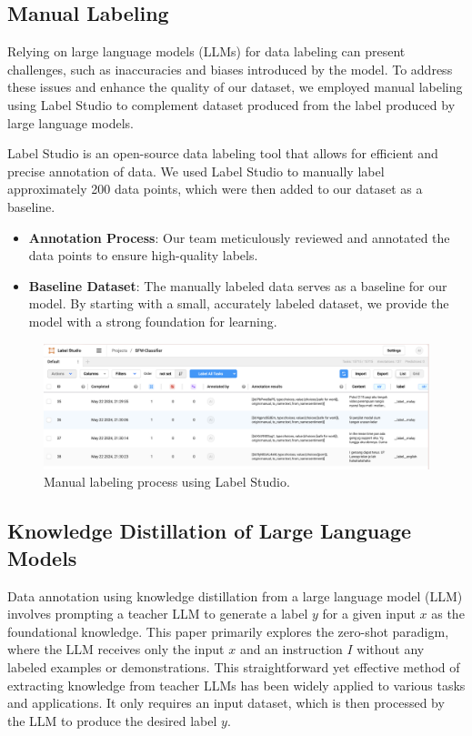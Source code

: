 \documentclass[preprint]{article}
\begin{document}
\subsection{Manual Labeling}
Relying on large language models (LLMs) for data labeling can present challenges, such as inaccuracies and biases introduced by the model. To address these issues and enhance the quality of our dataset, we employed manual labeling using Label Studio to complement dataset produced from the label produced by large language models.

Label Studio is an open-source data labeling tool that allows for efficient and precise annotation of data. We used Label Studio to manually label approximately 200 data points, which were then added to our dataset as a baseline.

\begin{itemize}
    \item \textbf{Annotation Process}: Our team meticulously reviewed and annotated the data points to ensure high-quality labels. 
    \item \textbf{Baseline Dataset}: The manually labeled data serves as a baseline for our model. By starting with a small, accurately labeled dataset, we provide the model with a strong foundation for learning.
\end{itemize}

\begin{figure}[h]
  \centering
  \includegraphics[width=0.6\linewidth]{img/labelstudio.png}
  \caption{Manual labeling process using Label Studio.}
\end{figure}

\subsection{Knowledge Distillation of Large Language Models}

Data annotation using knowledge distillation from a large language model (LLM) involves prompting a teacher LLM to generate a label \( y \) for a given input \( x \) as the foundational knowledge. This paper primarily explores the zero-shot paradigm, where the LLM receives only the input \( x \) and an instruction \( I \) without any labeled examples or demonstrations. This straightforward yet effective method of extracting knowledge from teacher LLMs has been widely applied to various tasks and applications. It only requires an input dataset, which is then processed by the LLM to produce the desired label \( y \).
\end{document}
